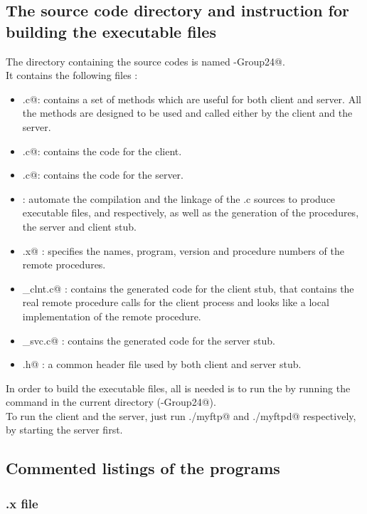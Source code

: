 \documentclass{article}
\begin{document}
\subsection{The source code directory and instruction for building the executable files}
The directory containing the source codes is named -Group24@.  \\
It contains the following files : 
\begin{itemize}
\item \verb@utils.c@: contains a set of methods which are useful for both client and server. All the methods are designed to be used and called either by the client and the server. 
\item \verb@myftp.c@: contains the code for the client.
\item \verb@myftpd.c@: contains the code for the server.
\item \verb@Makefile@: automate the compilation and the linkage of the .c sources to produce executable files, \verb@myftp@ and \verb@myftpd@ respectively, as well as the generation of the \verb@XDR@ procedures, the server and client stub.
\item \verb@rpspec.x@ : specifies the names, program, version and procedure numbers of the remote procedures.
\item \verb@rpspec_clnt.c@ : contains the generated code for the client stub, that contains the real remote procedure calls for the client process and looks like a local implementation of the remote procedure.
\item \verb@rpspec_svc.c@ : contains the generated code for the server stub.
\item \verb@rpspec.h@ : a common header file used by both client and server stub.
\end{itemize}
In order to build the executable files, all is needed is to run the \verb@Makefile@ by running the \verb@make@ command in the current directory (-Group24@).\\

To run the client and the server, just run \verb@./myftp@ and \verb@./myftpd@ respectively, by starting the server first.
\subsection{Commented listings of the programs}
 \subsubsection{.x file}~
   
 
\end{document}
